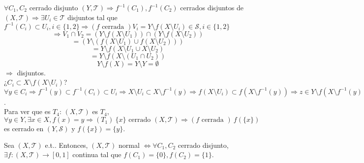 \begin{dem}
$\forall C_{1}, C_{2}$ cerrado disjunto $( Y, \mathcal{T} ) \Rightarrow f^{-1}(C_{1}), f^{-1}(C_{2})$ cerrados disjuntos de $( X, \mathcal{T} ) \Rightarrow \exists U_{i} \in \mathcal{T}$ disjuntos tal que $f^{-1}(C_{i}) \subset U_{i}, i \in \{ 1, 2 \} \Rightarrow (f \text{ cerrada }) V_{i} = Y \setminus f(X \setminus U_{i}) \in \mathcal{S}, i \in \{ 1, 2 \} $ 
\[
  \Rightarrow V_{1} \cap V_{2} = ( Y \setminus f(X \setminus U_{1}) ) \cap ( Y \setminus f(X \setminus U_{2})) 
\]
\[
  = (Y \setminus (f(X \setminus U_{1}) \cup f(X \setminus U_{2})) )
\]
\[ 
  = Y \setminus f(X \setminus U_{1} \cup X \setminus U_{2}) 
\] 
\[ 
  = Y \setminus f(X \setminus (U_{1} \cap U_{2}))
\] 
\[ 
  Y \setminus f(X) = Y \setminus Y = \emptyset 
\] 
$\Rightarrow$ disjuntos. \\

¿$C_{i} \subset X \setminus f(X \setminus U_{i})$? $ \forall y \in C_{i} \Rightarrow f^{-1}(y) \subset f^{-1}(C_{i}) \subset U_{i} \Rightarrow X \setminus U_{i} \subset X \setminus f^{-1}(y) \Rightarrow f(X \setminus U_{i} ) \subset f(X \setminus f^{-1}(y)) \Rightarrow z \in Y \setminus f(X \setminus f^{-1}(y)) \subset Y \setminus f(X \setminus U_{i}) = V_{i} \Rightarrow z \not \in f(X \setminus f^{-1}(y)) \Rightarrow z = f(x') : x' \in X \setminus f^{-1}(y) \Rightarrow x' \in f^{-1}(y) \Rightarrow f(x') = y \Rightarrow z = y \Rightarrow \forall y \in C_{i}, y \in V_{i}$. \\

Para ver que es $T_{4}$:  $( X, \mathcal{T} )$ es $T_{4}$, $\forall y \in Y, \exists x \in X, f(x) = y \Rightarrow (T_{1}) \ \{ x \} \text{ cerrado } ( X, \mathcal{T} ) \Rightarrow (f \text{ cerrada }) \ f(\{ x \})$ es cerrado en $( Y, \mathcal{S} )$ y $ f(\{ x \}) = \{  y \}$.
%
\end{dem}

\begin{lem}[Urysohn]
  Sea $( X, \mathcal{T} )$ e.t.. Entonces, $( X, \mathcal{T} )$ normal $\Leftrightarrow \forall C_{1}, C_{2}$ cerrado disjunto, $\exists f: ( X, \mathcal{T} ) \to [0, 1]$ continua tal que $f(C_{1}) = \{  0 \}, f(C_{2}) = \{ 1 \}$.
\end{lem}
